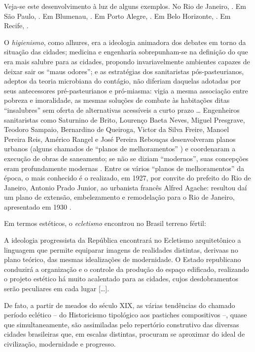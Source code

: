 Veja-se este desenvolvimento à luz de alguns exemplos. No Rio de Janeiro, \cite{singer_evourb_1968}. Em São Paulo, \cite{singer_evourb_1968}. Em Blumenau, \cite{singer_evourb_1968}. Em Porto Alegre, \cite{singer_evourb_1968}. Em Belo Horizonte, \cite{singer_evourb_1968}. Em Recife, \cite{singer_evourb_1968}. 

O \textit{higienismo}, como alhures, era a ideologia animadora dos debates em torno da situação das cidades; medicina e engenharia sobrepunham-se na definição do que era mais salubre para as cidades, propondo invariavelmente ambientes capazes de deixar sair os ``maus odores''; e as estratégias dos sanitaristas pós-pasteurianos, adeptos da teoria microbiana do contágio, não diferiam daquelas adotadas por seus antecessores pré-pasteurianos e pró-miasma: vigia a mesma associação entre pobreza e imoralidade, as mesmas soluções de combate às habitações ditas ``insalubres'' sem oferta de alternativas acessíveis a curto prazo \dots \cite{CAPONI2002} Engenheiros sanitaristas como Saturnino de Brito, Lourenço Baeta Neves, Miguel Presgrave, Teodoro Sampaio, Bernardino de Queiroga, Victor da Silva Freire, Manoel Pereira Reis, Américo Rangel e José Pereira Rebouças desenvolveram planos urbanos (alguns chamados de ``planos de melhoramentos'' \cite{leme_urbasp_1991}) e coordenaram a execução de obras de saneamento; se não se diziam ``modernos'', suas concepções eram profundamente modernas \cite{andrade_saturnino_1991}. Entre os vários ``planos de melhoramentos'' da época, o mais conhecido é o realizado, em 1927, por convite do prefeito do Rio de Janeiro, Antonio Prado Junior, ao urbanista francês Alfred Agache: resultou daí um plano de extensão, embelezamento e remodelação para o Rio de Janeiro, apresentado em 1930 \cite{pinheiro_capiconsul_2009}. 

Em termos estéticos, o \textit{ecletismo} encontrou no Brasil terreno fértil:

\begin{citacao}
A ideologia progressista da República encontrará no Ecletismo arquitetônico a linguagem que permite equiparar imagens de realidades distintas, derivaas no plano teórico, das mesmas idealizações de modernidade. O Estado republicano conduzirá a organização e o controle da produção do espaço edificado, realizando o projeto estético há muito acalentado para as cidades, cujos desdobramentos serão peculiares em cada lugar [\dots].

De fato, a partir de meados do século XIX, as várias tendências do chamado período eclético -- do Historicismo tipológico aos pastiches compositivos --, quase que simultaneamente, são assimiladas pelo repertório construtivo das diversas cidades brasileiras que, em escalas distintas, procuram se aproximar do ideal de civilização, modernidade e progresso. \cite[p.~259-260]{almeida_vitrinescomercio_2014}
\end{citacao}

